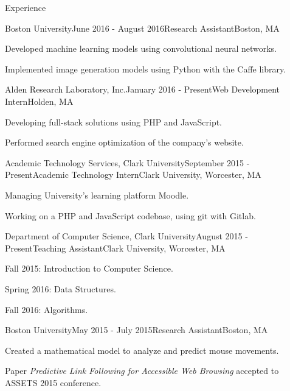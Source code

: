 \documentclass{resume} %
\begin{document}
\begin{rSection}{Experience}


\begin{rSubsection}{Boston University}{June 2016 - August 2016}{Research Assistant}{Boston, MA}
\item Developed machine learning models using convolutional neural networks.
\item Implemented image generation models using Python with the Caffe library.
\end{rSubsection}


\begin{rSubsection}{Alden Research Laboratory, Inc.}{January 2016 - Present}{Web Development Intern}{Holden, MA}
\item Developing full-stack solutions using PHP and JavaScript.
\item Performed search engine optimization of the company's website.
\end{rSubsection}


\begin{rSubsection}{Academic Technology Services, Clark University}{September 2015 - Present}{Academic Technology Intern}{Clark University, Worcester, MA}
\item Managing University's learning platform Moodle.
\item Working on a PHP and JavaScript codebase, using git with Gitlab.
\end{rSubsection}


\begin{rSubsection}{Department of Computer Science, Clark University}{August 2015 - Present}{Teaching Assistant}{Clark University, Worcester, MA}
\item Fall 2015: Introduction to Computer Science.
\item Spring 2016: Data Structures.
\item Fall 2016: Algorithms.
\end{rSubsection}


\begin{rSubsection}{Boston University}{May 2015 - July 2015}{Research Assistant}{Boston, MA}
\item Created a mathematical model to analyze and predict mouse movements.
\item Paper \emph{Predictive Link Following for Accessible Web Browsing} accepted to ASSETS 2015 conference.
\end{rSubsection}


\end{rSection}
\end{document}
